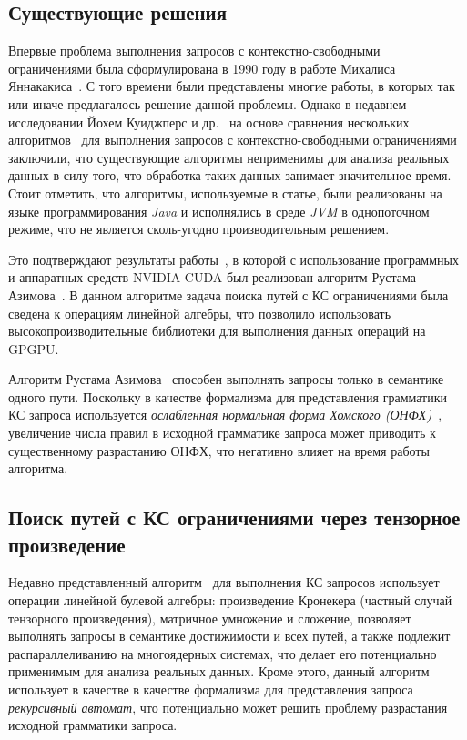 \subsection{Существующие решения}

Впервые проблема выполнения запросов с контекстно-свободными ограничениями была сформулирована в 1990 году в работе Михалиса Яннакакиса~\cite{inproceedings:yannakakis_cfpq_problem}. С того времени были представлены многие работы, в которых так или иначе предлагалось решение данной проблемы. Однако в недавнем исследовании Йохем Куиджперс и др.~\cite{article:kuijpers_cfpq_exp_compare} на основе сравнения нескольких алгоритмов~\cite{article:hellings_cfpq,inproceedings:matrix_cfpq,inbook:santos_cfpq_lr_analysis} для выполнения запросов с контекстно-свободными ограничениями заключили, что существующие алгоритмы неприменимы для анализа реальных данных в силу того, что обработка таких данных занимает значительное время. Стоит отметить, что алгоритмы, используемые в статье, были реализованы на языке программирования \textit{Java} и исполнялись в среде \textit{JVM} в однопоточном режиме, что не является сколь-угодно производительным решением.

Это подтверждают результаты работы~\cite{inproceedings:cfqp_matrix_with_single_source}, в которой с использование программных и аппаратных средств NVIDIA CUDA был реализован алгоритм Рустама Азимова~\cite{inproceedings:matrix_cfpq}. В данном алгоритме задача поиска путей с КС ограничениями была сведена к операциям линейной алгебры, что позволило использовать высокопроизводительные библиотеки для выполнения данных операций на GPGPU.

Алгоритм Рустама Азимова~\cite{inproceedings:cfqp_matrix_with_single_source} способен выполнять запросы только в семантике одного пути. Поскольку в качестве формализма для представления грамматики КС запроса используется \textit{ослабленная нормальная форма Хомского (ОНФХ)}~\cite{book:automata_theory}, увеличение числа правил в исходной грамматике запроса может приводить к существенному разрастанию ОНФХ, что негативно влияет на время работы алгоритма.

\subsection{Поиск путей с КС ограничениями через тензорное произведение}

Недавно представленный алгоритм~\cite{inbook:kronecker_cfpq_adbis} для выполнения КС запросов использует операции линейной булевой алгебры: произведение Кронекера (частный случай тензорного произведения), матричное умножение и сложение, позволяет выполнять запросы в семантике достижимости и всех путей, а также подлежит распараллеливанию на многоядерных системах, что делает его потенциально применимым для анализа реальных данных. Кроме этого, данный алгоритм использует в качестве в качестве формализма для представления запроса \textit{рекурсивный автомат}, что потенциально может решить проблему разрастания исходной грамматики запроса. 

